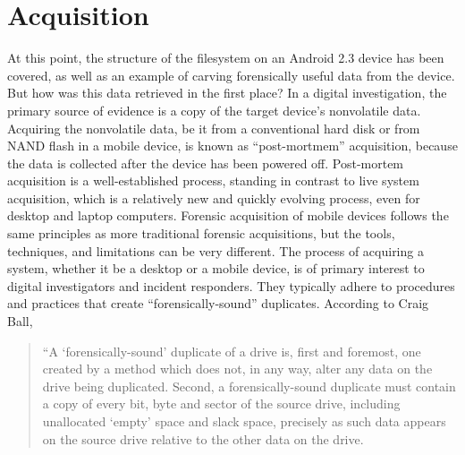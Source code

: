 \section{Acquisition}
At this point, the structure of the filesystem on an Android 2.3 device has been covered, as well as an example of carving
forensically useful data from the device. But how was this data retrieved in the first place? In a digital investigation, the
primary source of evidence is a copy of the target device's nonvolatile data.  Acquiring the nonvolatile data, be it from a
conventional hard disk or from NAND flash in a mobile device, is known as ``post-mortmem'' acquisition, because the data is
collected after the device has been powered off.  Post-mortem acquisition is a well-established process, standing in contrast to
live system acquisition, which is a relatively new and quickly evolving process, even for desktop and laptop computers.  Forensic
acquisition of mobile devices follows the same principles as more traditional forensic acquisitions, but the tools, techniques, and
limitations can be very different. The process of acquiring a system, whether it be a desktop or a mobile device, is of primary
interest to digital investigators and incident responders. They typically adhere to procedures and practices that create
``forensically-sound'' duplicates.  According to Craig Ball, 

\begin{quote}
“A ‘forensically-sound’ duplicate of a drive is, first and foremost, one created by a method which does not, in any way, alter any data on the drive being duplicated. 
Second, a forensically-sound duplicate must contain a copy of every bit, byte and sector of the source drive, including unallocated ‘empty’ space and slack space, precisely as such data appears on the source drive relative to the other data on the drive. 

\hspace{\fill}\cite{ball}
\end{quote}

